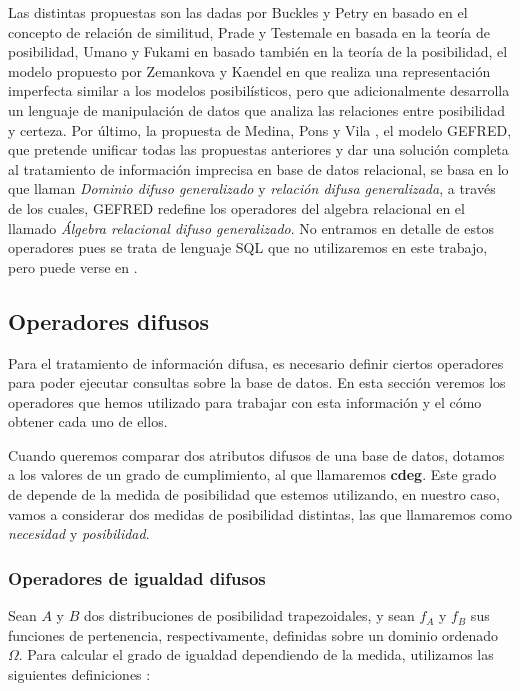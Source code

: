 Las distintas propuestas son las dadas por Buckles y Petry en \cite{buckles, buckles2, buckles3} basado en el concepto de relación de similitud, Prade y Testemale en \cite{prade, prade2, prade3, prade4} basada en la teoría de posibilidad, Umano y Fukami en \cite{fukami, fukami2, fukami3, fukami4} basado también en la teoría de la posibilidad, el modelo propuesto por Zemankova y Kaendel en \cite{zemankova, zemankova2} que realiza una representación imperfecta similar a los modelos posibilísticos, pero que adicionalmente desarrolla un lenguaje de manipulación de datos que analiza las relaciones entre posibilidad y certeza. Por último, la propuesta de Medina, Pons y Vila \cite{gefred}, el modelo GEFRED, que pretende unificar todas las propuestas anteriores y dar una solución completa al tratamiento de información imprecisa en base de datos relacional, se basa en lo que llaman \textit{Dominio difuso generalizado} y \textit{relación difusa generalizada}, a través de los cuales, GEFRED redefine los operadores del algebra relacional en el llamado \textit{Álgebra relacional difuso generalizado}. No entramos en detalle de estos operadores pues se trata de lenguaje SQL que no utilizaremos en este trabajo, pero puede verse en \cite{gefred}.

\subsection{Operadores difusos}\label{cdeg}

Para el tratamiento de información difusa, es necesario definir ciertos operadores para poder ejecutar consultas sobre la base de datos. En esta sección veremos los operadores que hemos utilizado para trabajar con esta información y el cómo obtener cada uno de ellos.

Cuando queremos comparar dos atributos difusos de una base de datos, dotamos a los valores de un grado de cumplimiento, al que llamaremos \textbf{cdeg}. Este grado de depende de la medida de posibilidad que estemos utilizando, en nuestro caso, vamos a considerar dos medidas de posibilidad distintas, las que llamaremos como \textit{necesidad} y \textit{posibilidad}.

\subsubsection{Operadores de igualdad difusos}

Sean $A$ y $B$ dos distribuciones de posibilidad trapezoidales, y sean $f_A$ y $f_B$ sus funciones de pertenencia, respectivamente, definidas sobre un dominio ordenado $\Omega$. Para calcular el grado de igualdad dependiendo de la medida, utilizamos las siguientes definiciones \cite{tesispepe}:

